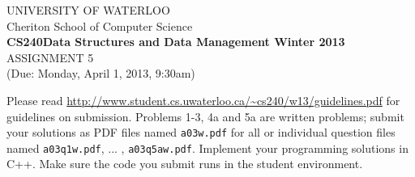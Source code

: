 \documentclass[11pt]{article}
\begin{document}
%
%
\begin{center}
UNIVERSITY OF WATERLOO\\
Cheriton School of Computer Science\\[\baselineskip]
{\bf CS240\hfill Data Structures and Data Management \hfill
Winter 2013}\\[\baselineskip]
{\sc \large ASSIGNMENT 5}\\
(Due: Monday, April 1, 2013, 9:30am)\\[2\baselineskip]
\end{center}
%
%

\noindent


Please read \url{http://www.student.cs.uwaterloo.ca/~cs240/w13/guidelines.pdf} for
guidelines on submission. Problems 1-3, 4a and 5a are written problems; submit your solutions as PDF files named {\tt a03w.pdf} for all or individual question files named {\tt a03q1w.pdf}, ... , {\tt a03q5aw.pdf}. Implement your programming solutions in C++. Make sure the code you submit runs in the student environment.
\noindent
\end{document}
